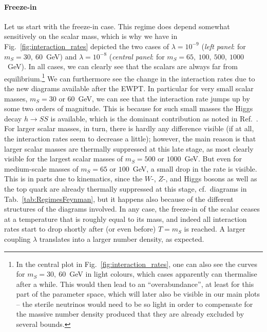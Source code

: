 \paragraph{Freeze-in} Let us start with the freeze-in case. This regime does depend somewhat sensitively on the scalar mass, which is why we have in Fig.~\ref{fig:interaction_rates} depicted the two cases of $\lambda=10^{-9}$ (\emph{left panel}: for $m_S = 30,~60$~GeV) and $\lambda=10^{-8}$ (\emph{central panel}: for $m_S = 65,~100,~500,~1000$~GeV). In all cases, we can clearly see that the scalars are always far from equilibrium.\footnote{In the central plot in Fig.~\ref{fig:interaction_rates}, one can also see the curves for $m_S = 30,~60$~GeV in light colours, which cases apparently can thermalise after a while. This would then lead to an ``overabundance'', at least for this part of the parameter space, which will later also be visible in our main plots -- the sterile neutrinos would need to be so light in order to compensate for the massive number density produced that they are already excluded by several bounds.} We can furthermore see the change in the interaction rates due to the new diagrams available after the EWPT. In particular for very small scalar masses, $m_S = 30$ or $60$~GeV, we can see that the interaction rate jumps up by some two orders of magnitude. This is because for such small masses the Higgs decay $h \to S S$ is available, which is the dominant contribution as noted in Ref.~\cite{Adulpravitchai:2014xna}. For larger scalar masses, in turn, there is hardly any difference visible (if at all, the interaction rates seem to decrease a little); however, the main reason is that larger scalar masses are thermally suppressed at this late stage, as most clearly visible for the largest scalar masses of $m_S = 500$ or $1000$~GeV. But even for medium-scale masses of $m_S = 65$ or $100$~GeV, a small drop in the rate is visible. This is in parts due to kinematics, since the $W$-, $Z$-, and Higgs bosons as well as the top quark are already thermally suppressed at this stage, cf.\ diagrams in Tab.~\ref{tab:RegimesFeynman}, but it happens also because of the different structures of the diagrams involved. In any case, the freeze-in of the scalar ceases at a temperature that is roughly equal to its mass, and indeed all interaction rates start to drop shortly after (or even before) $T = m_S$ is reached. A larger coupling $\lambda$ translates into a larger number density, as expected.

